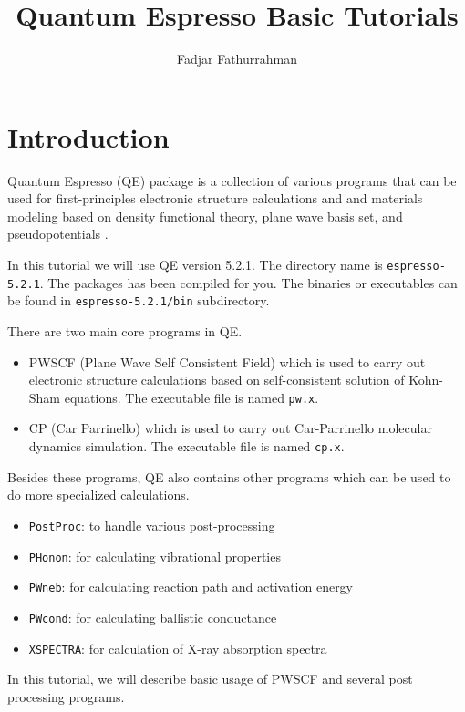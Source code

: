 \documentclass[12pt,english]{paper}
\begin{document}
\title{Quantum Espresso Basic Tutorials}

\author{Fadjar Fathurrahman}

\maketitle

\section{Introduction}

Quantum Espresso (QE) package is a collection of various programs
that can be used for first-principles electronic structure calculations
and and materials modeling based on density functional theory, plane
wave basis set, and pseudopotentials \cite{Giannozzi2009}.

In this tutorial we will use QE version 5.2.1. The directory name
is \texttt{espresso-5.2.1}. The packages has been compiled for you.
The binaries or executables can be found in \texttt{espresso-5.2.1/bin}
subdirectory.

There are two main core programs in QE.
\begin{itemize}
\item PWSCF (Plane Wave Self Consistent Field) which is used to carry out
electronic structure calculations based on self-consistent solution
of Kohn-Sham equations. The executable file is named \texttt{pw.x}.
\item CP (Car Parrinello) which is used to carry out Car-Parrinello molecular
dynamics simulation. The executable file is named \texttt{cp.x}.
\end{itemize}
Besides these programs, QE also contains other programs which can
be used to do more specialized calculations.
\begin{itemize}
\item \texttt{PostProc}: to handle various post-processing
\item \texttt{PHonon}: for calculating vibrational properties
\item \texttt{PWneb}: for calculating reaction path and activation energy
\item \texttt{PWcond}: for calculating ballistic conductance
\item \texttt{XSPECTRA}: for calculation of X-ray absorption spectra
\end{itemize}
In this tutorial, we will describe basic usage of PWSCF and several
post processing programs.
\end{document}
